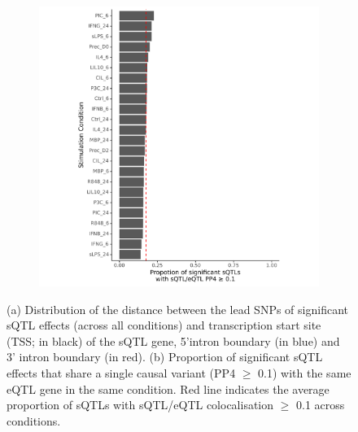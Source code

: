 \begin{figure}[H]
\begin{subfigure}[b]{0.45\textwidth}
      \includegraphics[width=\textwidth]{esqtl}
      \caption{}
      \label{fig:esqtl}
  \end{subfigure}


     \caption[Lead sQTL SNP position distribution and colocalisation between sQTLs and eQTLs]{(a) Distribution of the distance between the lead SNPs of significant sQTL effects (across all conditions) and transcription start site (TSS; in black) of the sQTL gene, 5'intron boundary (in blue) and 3' intron boundary (in red). (b) Proportion of significant sQTL effects that share a single causal variant (PP4 $\geq$ 0.1) with the same eQTL gene in the same condition. Red line indicates the average proportion of sQTLs with sQTL/eQTL colocalisation $\geq$ 0.1 across conditions.}
     \label{fig:tss_esqtl}
\end{figure}
